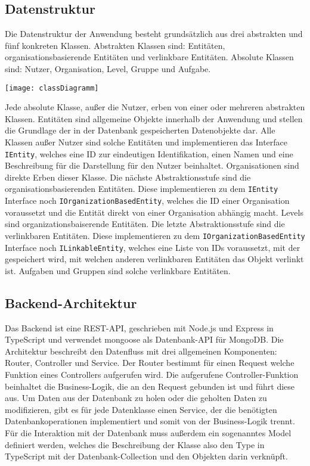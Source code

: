 \subsection{Datenstruktur}
Die Datenstruktur der Anwendung besteht grundsätzlich aus drei abstrakten und fünf konkreten Klassen. Abstrakten Klassen sind: Entitäten, organisationsbasierende Entitäten und verlinkbare Entitäten. Absolute Klassen sind: Nutzer, Organisation, Level, Gruppe und Aufgabe.

\vspace{20pt}
\begin{center}
    \begin{minipage}{0.8\linewidth}
        \texttt{[image: classDiagramm]}
    \end{minipage}
\end{center}
\vspace{20pt}

Jede absolute Klasse, außer die Nutzer, erben von einer oder mehreren abstrakten Klassen. Entitäten sind allgemeine Objekte innerhalb der Anwendung und stellen die Grundlage der in der Datenbank gespeicherten Datenobjekte dar. Alle Klassen außer Nutzer sind solche Entitäten und implementieren das Interface \verb|IEntity|, welches eine ID zur eindeutigen Identifikation, einen Namen und eine Beschreibung für die Darstellung für den Nutzer beinhaltet. Organisationen sind direkte Erben dieser Klasse. Die nächste Abstraktionsstufe sind die organisationsbasierenden Entitäten. Diese implementieren zu dem \verb|IEntity| Interface noch \verb|IOrganizationBasedEntity|, welches die ID einer Organisation voraussetzt und die Entität direkt von einer Organisation abhängig macht. Levels sind organizationsbaiserende Entitäten. Die letzte Abstraktionsstufe sind die verlinkbaren Entitäten. Diese implementieren zu dem \verb|IOrganizationBasedEntity| Interface noch \verb|ILinkableEntity|, welches eine Liste von IDs voraussetzt, mit der gespeichert wird, mit welchen anderen verlinkbaren Entitäten das Objekt verlinkt ist. Aufgaben und Gruppen sind solche verlinkbare Entitäten.

\subsection{Backend-Architektur}
Das Backend ist eine REST-API, geschrieben mit Node.js und Express in TypeScript und verwendet mongoose als Datenbank-API für MongoDB. Die Architektur beschreibt den Datenfluss mit drei allgemeinen Komponenten: Router, Controller und Service.
Der Router bestimmt für einen Request welche Funktion eines Controllers aufgerufen wird. Die aufgerufene Controller-Funktion beinhaltet die Business-Logik, die an den Request gebunden ist und führt diese aus. Um Daten aus der Datenbank zu holen oder die geholten Daten zu modifizieren, gibt es für jede Datenklasse einen Service, der die benötigten Datenbankoperationen implementiert und somit von der Business-Logik trennt. Für die Interaktion mit der Datenbank muss außerdem ein sogenanntes Model definiert werden, welches die Beschreibung der Klasse also den Type in TypeScript mit der Datenbank-Collection und den Objekten darin verknüpft.

